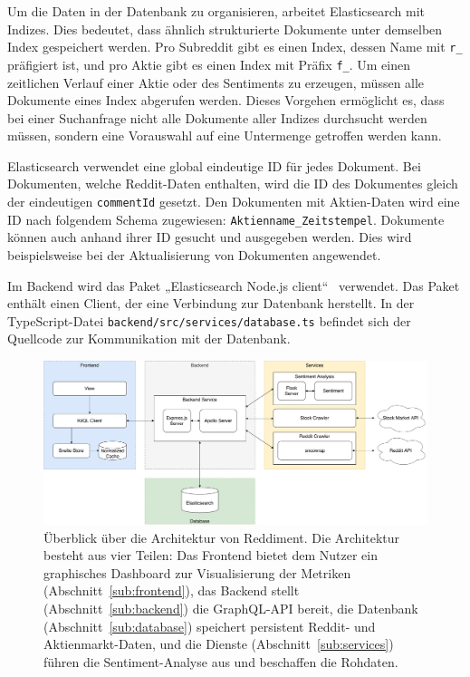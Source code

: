 \documentclass[a4paper, 10pt, conference]{IEEEtran}
\begin{document}
Um die Daten in der Datenbank zu organisieren, arbeitet Elasticsearch mit Indizes. Dies bedeutet, dass ähnlich strukturierte  Dokumente unter demselben Index gespeichert werden. Pro Subreddit gibt es einen Index, dessen Name mit \texttt{r\_} präfigiert ist, und pro Aktie gibt es einen Index mit Präfix \texttt{f\_}. Um einen zeitlichen Verlauf einer Aktie oder des Sentiments zu erzeugen, müssen alle Dokumente eines Index abgerufen werden. Dieses Vorgehen ermöglicht es, dass bei einer Suchanfrage nicht alle Dokumente aller Indizes durchsucht werden müssen, sondern eine Vorauswahl auf eine Untermenge getroffen werden kann.

Elasticsearch verwendet eine global eindeutige ID für jedes Dokument. Bei Dokumenten, welche Reddit-Daten enthalten, wird die ID des Dokumentes gleich der eindeutigen \texttt{commentId} gesetzt. Den Dokumenten mit Aktien-Daten wird eine ID nach folgendem Schema zugewiesen: \texttt{Aktienname\_Zeitstempel}. Dokumente können auch anhand ihrer ID gesucht und ausgegeben werden. Dies wird beispielsweise bei der Aktualisierung von Dokumenten angewendet.

Im Backend wird das Paket „Elasticsearch Node.js client“~\cite{elasticnode} verwendet. Das Paket enthält einen Client, der eine Verbindung zur Datenbank herstellt. In der TypeScript-Datei \texttt{backend/src/services/database.ts} befindet sich der Quellcode zur Kommunikation mit der Datenbank.

\begin{figure}[ht]
	\centering
	\includegraphics[width=\linewidth]{architecture}
	\caption{Überblick über die Architektur von Reddiment. Die Architektur besteht aus vier Teilen: Das Frontend bietet dem Nutzer ein graphisches Dashboard zur Visualisierung der Metriken (Abschnitt~\ref{sub:frontend}),  das Backend stellt (Abschnitt~\ref{sub:backend}) die GraphQL-API bereit, die Datenbank (Abschnitt~\ref{sub:database}) speichert persistent Reddit- und Aktienmarkt-Daten, und die Dienste (Abschnitt~\ref{sub:services}) führen die Sentiment-Analyse aus und beschaffen die Rohdaten.}
	\label{fig:architecture}
\end{figure}
\end{document}
